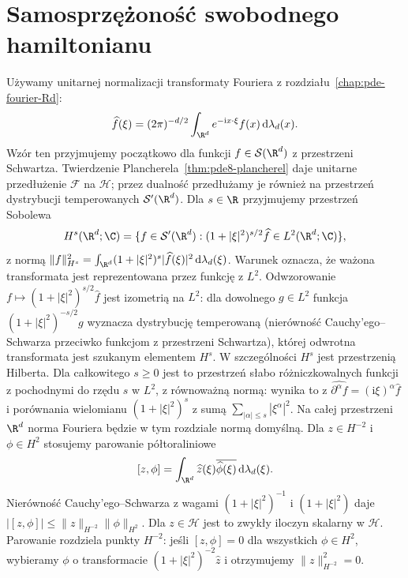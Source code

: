 \section{Samosprzężoność swobodnego hamiltonianu}
Używamy unitarnej normalizacji transformaty Fouriera z
rozdziału~\ref{chap:pde-fourier-Rd}:
\[
 \widehat f(\xi)=(2\pi)^{-d/2}
 \int_{\R^d}e^{-\mathrm i x\cdot\xi}f(x)\,\mathrm d\lambda_d(x).
\]
Wzór ten przyjmujemy początkowo dla funkcji
$f\in\mathcal S(\R^d)$ z przestrzeni Schwartza.
Twierdzenie Plancherela~\ref{thm:pde8-plancherel}
daje unitarne przedłużenie $\mathcal F$ na $\mathcal H$;
przez dualność przedłużamy je również na przestrzeń
dystrybucji temperowanych $\mathcal S'(\R^d)$.
Dla $s\in\R$ przyjmujemy przestrzeń Sobolewa
\[
 H^s(\R^d;\C)=
 \{f\in\mathcal S'(\R^d):
 (1+|\xi|^2)^{s/2}\widehat f\in L^2(\R^d;\C)\},
\]
z normą
$\|f\|_{H^s}^2=\int_{\R^d}(1+|\xi|^2)^s
|\widehat f(\xi)|^2\,\mathrm d\lambda_d(\xi)$.
Warunek oznacza, że ważona transformata jest
reprezentowana przez funkcję z $L^2$.
Odwzorowanie $f\mapsto (1+|\xi|^2)^{s/2}\widehat f$
jest izometrią na $L^2$: dla dowolnego $g\in L^2$
funkcja $(1+|\xi|^2)^{-s/2}g$ wyznacza dystrybucję
temperowaną (nierówność Cauchy'ego--Schwarza
przeciwko funkcjom z przestrzeni Schwartza),
której odwrotna transformata jest szukanym
elementem $H^s$. W szczególności $H^s$ jest
przestrzenią Hilberta.
Dla całkowitego $s\ge0$ jest to przestrzeń słabo
różniczkowalnych funkcji z pochodnymi do rzędu $s$
w $L^2$, z równoważną normą: wynika to z
$\widehat{\partial^\alpha f}=(\mathrm i\xi)^\alpha\widehat f$
i porównania wielomianu
$(1+|\xi|^2)^s$ z sumą $\sum_{|\alpha|\le s}|\xi^\alpha|^2$.
Na całej przestrzeni $\R^d$ norma Fouriera będzie
w tym rozdziale normą domyślną. Dla $z\in H^{-2}$
i $\phi\in H^2$ stosujemy parowanie półtoraliniowe
\[
 [z,\phi]=\int_{\R^d}\widehat z(\xi)
      \overline{\widehat\phi(\xi)}\,\mathrm d\lambda_d(\xi).
\]
Nierówność Cauchy'ego--Schwarza z wagami
$(1+|\xi|^2)^{-1}$ i $(1+|\xi|^2)$ daje
$|[z,\phi]|\le\|z\|_{H^{-2}}\|\phi\|_{H^2}$.
Dla $z\in\mathcal H$ jest to zwykły iloczyn
skalarny w $\mathcal H$. Parowanie rozdziela
punkty $H^{-2}$: jeśli $[z,\phi]=0$ dla wszystkich
$\phi\in H^2$, wybieramy $\phi$ o transformacie
$(1+|\xi|^2)^{-2}\widehat z$ i otrzymujemy
$\|z\|_{H^{-2}}^2=0$.

